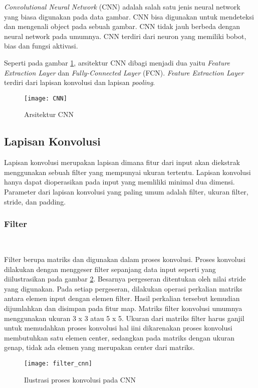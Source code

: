 \documentclass[../thesis.tex]{subfiles}
\begin{document}
\textit{Convolutional Neural Network} (CNN) adalah salah satu jenis neural network yang biasa digunakan pada data gambar. CNN bisa digunakan untuk mendeteksi dan mengenali object pada sebuah gambar.
CNN tidak jauh berbeda dengan neural network pada umumnya. CNN terdiri dari neuron yang memiliki bobot, bias dan fungsi aktivasi.

Seperti pada gambar \ref{arsi_CNN}, arsitektur CNN dibagi menjadi dua yaitu \textit{Feature Extraction Layer} dan \textit{Fully-Connected Layer} (FCN). \textit{Feature Extraction Layer} terdiri dari lapisan konvolusi dan lapisan \textit{pooling}.
\begin{figure}
	\centering
	\texttt{[image: CNN]}
	\caption{Arsitektur CNN}
	\label{arsi_CNN}
\end{figure}

\subsection{Lapisan Konvolusi}
Lapisan konvolusi merupakan lapisan dimana fitur dari input akan diekstrak menggunakan sebuah filter yang mempunyai ukuran tertentu. Lapisan konvolusi hanya dapat
dioperasikan pada input yang memliliki minimal dua dimensi. Parameter dari lapisan konvolusi yang paling umum adalah filter, ukuran filter, stride, dan padding.

\subsubsection{Filter} \hfill\

Filter berupa matriks dan digunakan dalam proses konvolusi. Proses konvolusi dilakukan dengan menggeser filter sepanjang data input seperti yang diilustrasikan pada gambar \ref{konvolusi_CNN}. Besarnya pergeseran ditentukan oleh nilai stride yang digunakan. Pada setiap pergeseran, dilakukan operasi perkalian matriks antara elemen input dengan elemen filter. Hasil perkalian tersebut kemudian dijumlahkan dan 
disimpan pada fitur map. Matriks filter konvolusi umumnya menggunakan ukuran 3 x 3 atau 5 x 5. Ukuran dari matriks filter harus ganjil untuk memudahkan proses konvolusi hal iini dikarenakan proses konvolusi membutuhkan satu elemen center, sedangkan pada matriks dengan ukuran genap, tidak ada elemen yang merupakan center dari matriks.

\begin{figure}
	\centering
	\texttt{[image: filter\_cnn]}
	\caption{Ilustrasi proses konvolusi pada CNN}
	\label{konvolusi_CNN}
\end{figure}
\end{document}
